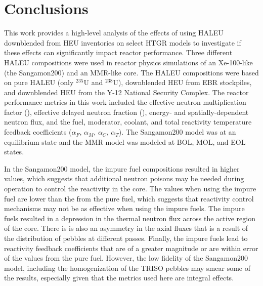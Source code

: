 \section{Conclusions}
This work provides a high-level analysis of the effects of using 
\gls*{HALEU} downblended from \gls*{HEU} inventories on select 
\gls*{HTGR} models to investigate if these 
effects can significantly impact 
reactor performance. Three different \gls*{HALEU} 
compositions were used in reactor physics simulations of 
an Xe-100-like (the Sangamon200) and an \gls*{MMR}-like 
core. The \gls*{HALEU} 
compositions were based on pure \gls*{HALEU} (only $^{235}$U and 
$^{238}$U), downblended \gls*{HEU} from \gls*{EBR} stockpiles, 
and downblended \gls*{HEU} from the Y-12 National Security Complex. 
The reactor performance metrics in this work included
the effective neutron multiplication factor (\keff), 
effective delayed neutron fraction (\betaEff), energy- and 
spatially-dependent 
neutron flux, and the fuel, moderator, coolant, and total reactivity 
temperature feedback coefficients ($\alpha_F$, $\alpha_M$,
$\alpha_C$, $\alpha_T$). The Sangamon200 model was 
at an equilibrium state and the \gls*{MMR} model was modeled 
at \gls*{BOL}, \gls*{MOL}, and \gls*{EOL} states. 

In the Sangamon200 model, the impure fuel compositions resulted 
in higher \keff values, which suggests that additional neutron 
poisons may be needed during operation to control the reactivity 
in the core. The \betaEff values when using the impure fuel are 
lower than the \betaEff from the pure fuel, which suggests that 
reactivity control mechanisms may not be as effective when using 
the impure fuels. The impure fuels resulted in a depression in the 
thermal neutron flux across the active region of the core. There is 
is also an asymmetry in the axial fluxes that is a result of the 
distribution of pebbles at different passes. Finally, the impure fuels 
lead to reactivity feedback coefficients that are of a greater magnitude 
or are within error of the values from the pure fuel. However, 
the low fidelity of the Sangamon200 model, including the homogenization
of the \gls*{TRISO} pebbles may smear some of the results, 
especially given that the metrics used here are integral effects.  


